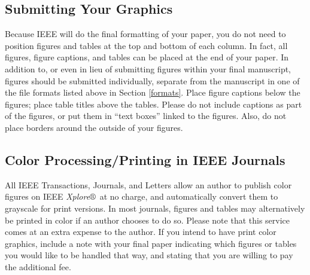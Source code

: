 \documentclass{ieeeaccess}
\begin{document}
\subsection{Submitting Your Graphics}
Because IEEE will do the final formatting of your paper,
you do not need to position figures and tables at the top and bottom of each
column. In fact, all figures, figure captions, and tables can be placed at
the end of your paper. In addition to, or even in lieu of submitting figures
within your final manuscript, figures should be submitted individually,
separate from the manuscript in one of the file formats listed above in
Section \ref{formats}. Place figure captions below the figures; place table titles
above the tables. Please do not include captions as part of the figures, or
put them in ``text boxes'' linked to the figures. Also, do not place borders
around the outside of your figures.

\subsection{Color Processing/Printing in IEEE Journals}
All IEEE Transactions, Journals, and Letters allow an author to publish
color figures on IEEE {\it Xplore}$\circledR$\ at no charge, and automatically
convert them to grayscale for print versions. In most journals, figures and
tables may alternatively be printed in color if an author chooses to do so.
Please note that this service comes at an extra expense to the author. If
you intend to have print color graphics, include a note with your final
paper indicating which figures or tables you would like to be handled that
way, and stating that you are willing to pay the additional fee.
\end{document}
